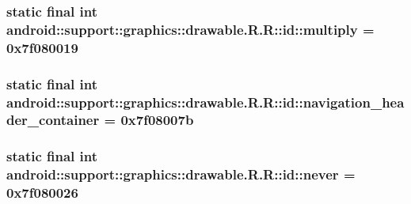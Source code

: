 \hypertarget{classandroid_1_1support_1_1graphics_1_1drawable_1_1_r_1_1id_54a47700a13058254f2159ae03887ee9}{
\subsubsection[{multiply}]{\setlength{\rightskip}{0pt plus 5cm}static final int android::support::graphics::drawable.R.R::id::multiply = 0x7f080019}}
\label{classandroid_1_1support_1_1graphics_1_1drawable_1_1_r_1_1id_54a47700a13058254f2159ae03887ee9}


\hypertarget{classandroid_1_1support_1_1graphics_1_1drawable_1_1_r_1_1id_0b57b0f98c18295091b78cb8b236fabd}{
\subsubsection[{navigation\_\-header\_\-container}]{\setlength{\rightskip}{0pt plus 5cm}static final int android::support::graphics::drawable.R.R::id::navigation\_\-header\_\-container = 0x7f08007b}}
\label{classandroid_1_1support_1_1graphics_1_1drawable_1_1_r_1_1id_0b57b0f98c18295091b78cb8b236fabd}


\hypertarget{classandroid_1_1support_1_1graphics_1_1drawable_1_1_r_1_1id_024494faf0317969fe6f79834ea7e4ad}{
\subsubsection[{never}]{\setlength{\rightskip}{0pt plus 5cm}static final int android::support::graphics::drawable.R.R::id::never = 0x7f080026}}
\label{classandroid_1_1support_1_1graphics_1_1drawable_1_1_r_1_1id_024494faf0317969fe6f79834ea7e4ad}


